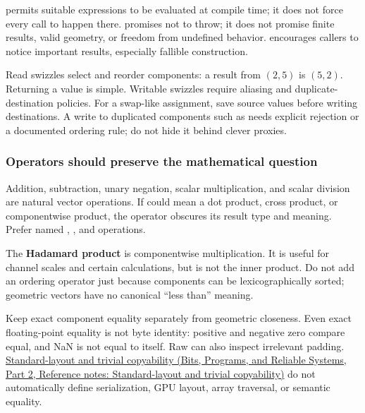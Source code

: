  permits suitable expressions to be evaluated at compile time; it does not force every call to happen there.  promises not to throw; it does not promise finite results, valid geometry, or freedom from undefined behavior. \BookInlineCode{{{[}}{{[}}{n}{o}{d}{i}{s}{c}{a}{r}{d}{{]}}{{]}}}{{[}{[}nodiscard{]}{]}} encourages callers to notice important results, especially fallible construction.

Read swizzles select and reorder components: a  result from \((2,5)\) is \((5,2)\). Returning a value is simple. Writable swizzles require aliasing and duplicate-destination policies. For a swap-like assignment, save source values before writing destinations. A write to duplicated components such as  needs explicit rejection or a documented ordering rule; do not hide it behind clever proxies.

\subsubsection{Operators should preserve the mathematical question}\label{02-foundations-ii-ch037-operators-should-preserve-the-mathematical-question}

\hypertarget{02-foundations-ii-ch037-operators-should-preserve-the-mathematical-question}{}

Addition, subtraction, unary negation, scalar multiplication, and scalar division are natural vector operations. If  could mean a dot product, cross product, or componentwise product, the operator obscures its result type and meaning. Prefer named , , and  operations.

The \textbf{Hadamard product} is componentwise multiplication. It is useful for channel scales and certain calculations, but is not the inner product. Do not add an ordering operator just because components can be lexicographically sorted; geometric vectors have no canonical ``less than'' meaning.

Keep exact component equality separately from geometric closeness. Even exact floating-point equality is not byte identity: positive and negative zero compare equal, and NaN is not equal to itself. Raw  can also inspect irrelevant padding. \href{../01-Bits-Programs-and-Reliable-Systems-P02/main.pdf\#nameddest=appendix-958870a64c53}{Standard-layout and trivial copyability (Bits, Programs, and Reliable Systems, Part 2, Reference notes: Standard-layout and trivial copyability)} do not automatically define serialization, GPU layout, array traversal, or semantic equality.

